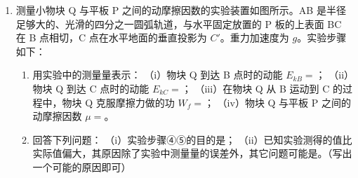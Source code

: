 \documentclass[\gkver]{gaokaozhenti}
\begin{document}
\begin{enumerate}
{\begin{enumerate}
	\item
	如图所示


\end{enumerate}
}

\item
测量小物块 Q 与平板 P 之间的动摩擦因数的实验装置如图所示。AB 是半径足够大的、光滑的四分之一圆弧轨道，与水平固定放置的 P 板的上表面 BC 在 B 点相切，C 点在水平地面的垂直投影为 $C'$。重力加速度为 $g$。实验步骤如下：


\begin{enumerate}
	\item
	用实验中的测量量表示：
	（i）物块 Q 到达 B 点时的动能 $E_{kB}=$；
	（ii）物块 Q 到达 C 点时的动能 $E_{kC}=$；
	（iii）在物块 Q 从 B 运动到 C 的过程中，物块 Q 克服摩擦力做的功 $W_f=$；
	（iv）物块 Q 与平板 P 之间的动摩擦因数 $\mu=$。

	\item
	回答下列问题：
	（i）实验步骤④⑤的目的是；
	（ii）已知实验测得的值比实际值偏大，其原因除了实验中测量量的误差外，其它问题可能是。（写出一个可能的原因即可）
\end{enumerate}

\end{enumerate}
\end{document}
